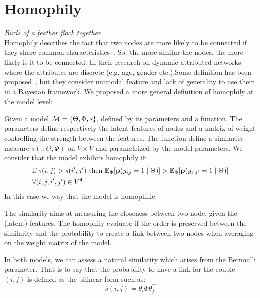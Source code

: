 \section{Homophily}
\emph{Birds of a feather flock together} ~\\


Homophily describes the fact that two nodes are more likely to be connected if they share common characteristics~\cite{mcpherson2001birds,lazarsfeld1954friendship}. So, the more similar the nodes, the more likely is it to be connected. In their research on dynamic attributed networks where the attributes are discrete (e.g. age, gender etc.).Some definition has been proposed~\cite{la2010randomization}, but they consider unimodal feature and lack of generality to use them in a Bayesian framework. We proposed a more general definition of homophily at the model level:

\begin{definition}[Homophily]
	Given  a model $\mathcal{M}=\{\Theta, \Phi, s\}$, defined by its parameters and a function. The parameters define respectively the latent features of nodes and a matrix of weight controlling the strength between the features. The function define a similarity measure $s(. ;\Theta, \Phi)$ on $V\times V$ and parametrized by the model parameters. We consider that the model exhibits homophily if:
	\begin{align*}
	&\textnormal{if }  s(i,j) > s(i',j') \textnormal{ then } \mathbb{E}_\Phi[\mathbf{p}(y_{ij}=1 \mid \Theta)] > \mathbb{E}_\Phi[\mathbf{p}(y_{i'j'}=1  \mid \Theta)] \\
	&\forall (i,j,i',j') \in V^4 \nonumber 
	\end{align*}
In this case we way that the model is homophilic.
\end{definition}

The similarity aims at measuring the closeness between two node, given the (latent) features. The homophily evaluate if the order is preserved between the similarity and the probability to create a link between two nodes when averaging on the weight matrix of the model.

In both models, we can assess a natural similarity which arises from the Bernoulli parameter. That is to say that the probability to have a link for the couple $(i,j)$ is defined as the bilinear form such as: 
\begin{equation}
s(i,j) = \theta_i \Phi \theta_j^\top
\end{equation}

